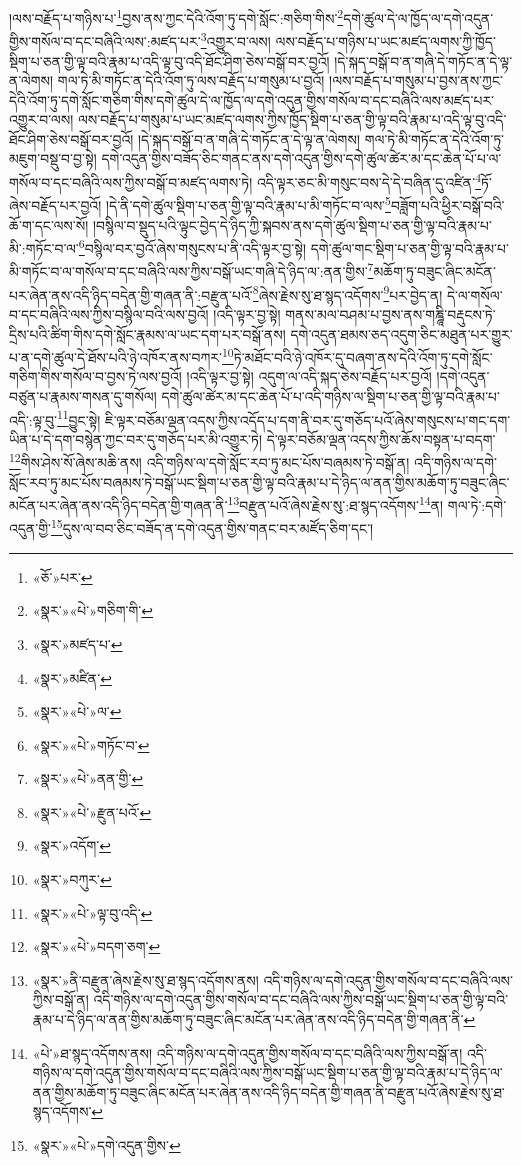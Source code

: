 །ལས་བརྗོད་པ་གཉིས་པ་\footnote{«ཅོ་»པར་}བྱས་ནས་ཀྱང་དེའི་འོག་ཏུ་དགེ་སློང་:གཅིག་གིས་\footnote{«སྣར་»«པེ་»གཅིག་གི་}དགེ་ཚུལ་དེ་ལ་ཁྱོད་ལ་དགེ་འདུན་གྱིས་གསོལ་བ་དང་བཞིའི་ལས་:མཛད་པར་\footnote{«སྣར་»མཛད་པ་}འགྱུར་བ་ལས། ལས་བརྗོད་པ་གཉིས་པ་ཡང་མཛད་ལགས་ཀྱི་ཁྱོད་སྡིག་པ་ཅན་གྱི་ལྟ་བའི་རྣམ་པ་འདི་ལྟ་བུ་འདི་ཐོང་ཤིག་ཅེས་བསྒོ་བར་བྱའོ། །དེ་སྐད་བསྒོ་བ་ན་གཞི་དེ་གཏོང་ན་དེ་ལྟ་ན་ལེགས། གལ་ཏེ་མི་གཏོང་ན་དེའི་འོག་ཏུ་ལས་བརྗོད་པ་གསུམ་པ་བྱའོ། །ལས་བརྗོད་པ་གསུམ་པ་བྱས་ནས་ཀྱང་དེའི་འོག་ཏུ་དགེ་སློང་གཅིག་གིས་དགེ་ཚུལ་དེ་ལ་ཁྱོད་ལ་དགེ་འདུན་གྱིས་གསོལ་བ་དང་བཞིའི་ལས་མཛད་པར་འགྱུར་བ་ལས། ལས་བརྗོད་པ་གསུམ་པ་ཡང་མཛད་ལགས་ཀྱིས་ཁྱོད་སྡིག་པ་ཅན་གྱི་ལྟ་བའི་རྣམ་པ་འདི་ལྟ་བུ་འདི་ཐོང་ཤིག་ཅེས་བསྒོ་བར་བྱའོ། །དེ་སྐད་བསྒོ་བ་ན་གཞི་དེ་གཏོང་ན་དེ་ལྟ་ན་ལེགས། གལ་ཏེ་མི་གཏོང་ན་དེའི་འོག་ཏུ་མཇུག་བསྡུ་བ་བྱ་སྟེ། དགེ་འདུན་གྱིས་བཟོད་ཅིང་གནང་ནས་དགེ་འདུན་གྱིས་དགེ་ཚུལ་ཚེར་མ་དང་ཆེན་པོ་པ་ལ་གསོལ་བ་དང་བཞིའི་ལས་ཀྱིས་བསྒོ་བ་མཛད་ལགས་ཏེ། འདི་ལྟར་ཅང་མི་གསུང་བས་དེ་དེ་བཞིན་དུ་འཛིན་\footnote{«སྣར་»མཛིན་}ཏོ་ཞེས་བརྗོད་པར་བྱའོ། །དེ་ནི་དགེ་ཚུལ་སྡིག་པ་ཅན་གྱི་ལྟ་བའི་རྣམ་པ་མི་གཏོང་བ་ལས་\footnote{«སྣར་»«པེ་»ལ་}བཟློག་པའི་ཕྱིར་བསྒོ་བའི་ཆོ་ག་དང་ལས་སོ། །བསྙིལ་བ་སྡུད་པའི་ལྟུང་བྱེད་དེ་ཉིད་ཀྱི་སྐབས་ནས་དགེ་ཚུལ་སྡིག་པ་ཅན་གྱི་ལྟ་བའི་རྣམ་པ་མི་:གཏོང་བ་ལ་\footnote{«སྣར་»«པེ་»གཏོང་བ་}བསྙིལ་བར་བྱའོ་ཞེས་གསུངས་པ་ནི་འདི་ལྟར་བྱ་སྟེ། དགེ་ཚུལ་གང་སྡིག་པ་ཅན་གྱི་ལྟ་བའི་རྣམ་པ་མི་གཏོང་བ་ལ་གསོལ་བ་དང་བཞིའི་ལས་ཀྱིས་བསྒོ་ཡང་གཞི་དེ་ཉིད་ལ་:ནན་གྱིས་\footnote{«སྣར་»«པེ་»ནན་གྱི་}མཆོག་ཏུ་བཟུང་ཞིང་མངོན་པར་ཞེན་ནས་འདི་ཉིད་བདེན་གྱི་གཞན་ནི་:བརྫུན་པའོ་\footnote{«སྣར་»«པེ་»རྫུན་པའོ་}ཞེས་རྗེས་སུ་ཐ་སྙད་འདོགས་\footnote{«སྣར་»འདོག་}པར་བྱེད་ན། དེ་ལ་གསོལ་བ་དང་བཞིའི་ལས་ཀྱིས་བསྙིལ་བའི་ལས་བྱའོ། །འདི་ལྟར་བྱ་སྟེ། གནས་མལ་བཤམ་པ་བྱས་ནས་གཎྜཱི་བརྡུངས་ཏེ་དྲིས་པའི་ཚིག་གིས་དགེ་སློང་རྣམས་ལ་ཡང་དག་པར་བསྒོ་ནས། དགེ་འདུན་ཐམས་ཅད་འདུག་ཅིང་མཐུན་པར་གྱུར་པ་ན་དགེ་ཚུལ་དེ་ཐོས་པའི་ཉེ་འཁོར་ནས་བཀར་\footnote{«སྣར་»བཀུར་}ཏེ་མཐོང་བའི་ཉེ་འཁོར་དུ་བཞག་ནས་དེའི་འོག་ཏུ་དགེ་སློང་གཅིག་གིས་གསོལ་བ་བྱས་ཏེ་ལས་བྱའོ། །འདི་ལྟར་བྱ་སྟེ། འདུག་ལ་འདི་སྐད་ཅེས་བརྗོད་པར་བྱའོ། །དགེ་འདུན་བཙུན་པ་རྣམས་གསན་དུ་གསོལ། དགེ་ཚུལ་ཚེར་མ་དང་ཆེན་པོ་པ་འདི་གཉིས་ལ་སྡིག་པ་ཅན་གྱི་ལྟ་བའི་རྣམ་པ་འདི་:ལྟ་བུ་\footnote{«སྣར་»«པེ་»ལྟ་བུ་འདི་}བྱུང་སྟེ། ཇི་ལྟར་བཅོམ་ལྡན་འདས་ཀྱིས་འདོད་པ་དག་ནི་བར་དུ་གཅོད་པའོ་ཞེས་གསུངས་པ་གང་དག་ཡིན་པ་དེ་དག་བསྙེན་ཀྱང་བར་དུ་གཅོད་པར་མི་འགྱུར་ཏེ། དེ་ལྟར་བཅོམ་ལྡན་འདས་ཀྱིས་ཆོས་བསྟན་པ་བདག་\footnote{«སྣར་»«པེ་»བདག་ཅག་}གིས་ཤེས་སོ་ཞེས་མཆི་ནས། འདི་གཉིས་ལ་དགེ་སློང་རབ་ཏུ་མང་པོས་བཞམས་ཏེ་བསྒོ་ན། འདི་གཉིས་ལ་དགེ་སློང་རབ་ཏུ་མང་པོས་བཞམས་ཏེ་བསྒོ་ཡང་སྡིག་པ་ཅན་གྱི་ལྟ་བའི་རྣམ་པ་དེ་ཉིད་ལ་ནན་གྱིས་མཆོག་ཏུ་བཟུང་ཞིང་མངོན་པར་ཞེན་ནས་འདི་ཉིད་བདེན་གྱི་གཞན་ནི་\footnote{«སྣར་»ནི་བརྫུན་ཞེས་རྗེས་སུ་ཐ་སྙད་འདོགས་ནས། འདི་གཉིས་ལ་དགེ་འདུན་གྱིས་གསོལ་བ་དང་བཞིའི་ལས་ཀྱིས་བསྒོ་ན། འདི་གཉིས་ལ་དགེ་འདུན་གྱིས་གསོལ་བ་དང་བཞིའི་ལས་ཀྱིས་བསྒོ་ཡང་སྡིག་པ་ཅན་གྱི་ལྟ་བའི་རྣམ་པ་དེ་ཉིད་ལ་ནན་གྱིས་མཆོག་ཏུ་བཟུང་ཞིང་མངོན་པར་ཞེན་ནས་འདི་ཉིད་བདེན་གྱི་གཞན་ནི་}བརྫུན་པའོ་ཞེས་རྗེས་སུ་:ཐ་སྙད་འདོགས་\footnote{«པེ་»ཐ་སྙད་འདོགས་ནས། འདི་གཉིས་ལ་དགེ་འདུན་གྱིས་གསོལ་བ་དང་བཞིའི་ལས་ཀྱིས་བསྒོ་ན། འདི་གཉིས་ལ་དགེ་འདུན་གྱིས་གསོལ་བ་དང་བཞིའི་ལས་ཀྱིས་བསྒོ་ཡང་སྡིག་པ་ཅན་གྱི་ལྟ་བའི་རྣམ་པ་དེ་ཉིད་ལ་ནན་གྱིས་མཆོག་ཏུ་བཟུང་ཞིང་མངོན་པར་ཞེན་ནས་འདི་ཉིད་བདེན་གྱི་གཞན་ནི་བརྫུན་པའོ་ཞེས་རྗེས་སུ་ཐ་སྙད་འདོགས་}ན། གལ་ཏེ་:དགེ་འདུན་གྱི་\footnote{«སྣར་»«པེ་»དགེ་འདུན་གྱིས་}དུས་ལ་བབ་ཅིང་བཟོད་ན་དགེ་འདུན་གྱིས་གནང་བར་མཛོད་ཅིག་དང་། 